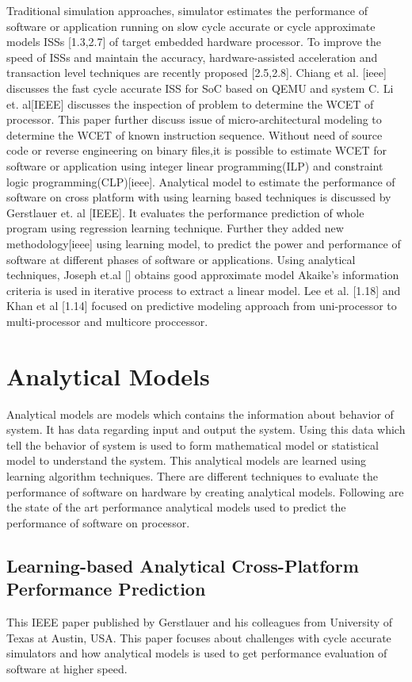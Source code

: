 	\par Traditional simulation approaches, simulator estimates the performance of software or application running on slow cycle accurate or cycle approximate models ISSs [1.3,2.7] of target embedded hardware processor. To improve the speed of ISSs and maintain the accuracy, hardware-assisted acceleration and transaction level techniques are recently proposed [2.5,2.8]. Chiang et al. [ieee] discusses the fast cycle accurate ISS for SoC based on QEMU and system C.  Li et. al[IEEE] discusses the inspection of problem to determine the WCET of processor. This paper further discuss issue of micro-architectural modeling to determine the WCET of known instruction sequence. Without need of source code or reverse engineering on binary files,it is possible to estimate WCET for software or application using integer linear programming(ILP) and constraint logic programming(CLP)[ieee]. Analytical model to estimate the performance of software on cross platform with using learning based techniques is discussed by Gerstlauer et. al [IEEE]. It evaluates the performance prediction of whole program using regression learning technique. Further they added new methodology[ieee] using learning model, to predict the power and performance of software at different phases of software or applications. Using analytical techniques, Joseph et.al [] obtains good approximate model Akaike's information criteria is used in iterative process to extract a linear model. Lee et al. [1.18] and Khan et al [1.14] focused on predictive modeling approach from uni-processor to multi-processor and multicore proccessor. 

\section{Analytical Models}
Analytical models are models which contains the information about behavior of system. It has data regarding input and output the system. Using this data which tell the behavior of system is used to form mathematical model or statistical model to understand the system. This analytical models are learned using learning algorithm techniques. There are different techniques to evaluate the performance of software on hardware by creating analytical models. Following are the state of the art performance analytical models used to predict the performance of software on processor.

\subsection{Learning-based Analytical Cross-Platform Performance Prediction}
This IEEE paper published by Gerstlauer and his colleagues from University of Texas at Austin, USA. This paper focuses about challenges with cycle accurate simulators and how analytical models is used to get performance evaluation of software at higher speed.

